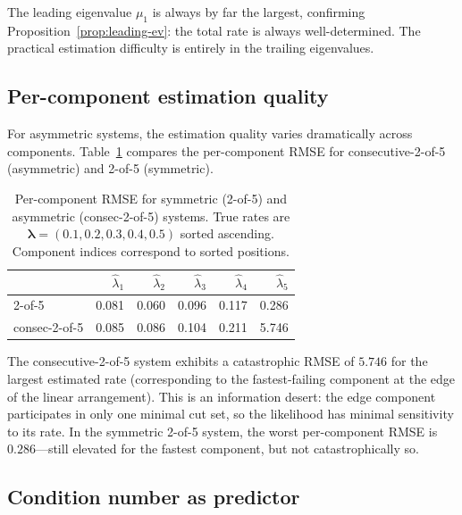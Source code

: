 \documentclass[12pt]{article}
\theoremstyle{definition}
\theoremstyle{remark}
\newcommand{\blam}{\boldsymbol{\lambda}}
\begin{document}
The leading eigenvalue $\mu_1$ is always by far the largest, confirming
Proposition~\ref{prop:leading-ev}: the total rate is always
well-determined.  The practical estimation difficulty is entirely in
the trailing eigenvalues.

\subsection{Per-component estimation quality}
\label{sec:per-component}

For asymmetric systems, the estimation quality varies dramatically
across components.  Table~\ref{tab:per-component} compares the
per-component RMSE for consecutive-2-of-5 (asymmetric) and 2-of-5
(symmetric).

\begin{table}[t]
\centering
\caption{Per-component RMSE for symmetric (2-of-5) and asymmetric
  (consec-2-of-5) systems.  True rates are
  $\blam = (0.1, 0.2, 0.3, 0.4, 0.5)$ sorted ascending.
  Component indices correspond to sorted positions.}
\label{tab:per-component}
\small
\begin{tabular}{lrrrrr}
\toprule
 & $\hat{\lambda}_1$ & $\hat{\lambda}_2$ & $\hat{\lambda}_3$
 & $\hat{\lambda}_4$ & $\hat{\lambda}_5$ \\
\midrule
2-of-5 & 0.081 & 0.060 & 0.096 & 0.117 & 0.286 \\
consec-2-of-5 & 0.085 & 0.086 & 0.104 & 0.211 & 5.746 \\
\bottomrule
\end{tabular}
\end{table}

The consecutive-2-of-5 system exhibits a catastrophic RMSE of $5.746$
for the largest estimated rate (corresponding to the fastest-failing
component at the edge of the linear arrangement).  This is an
information desert: the edge component participates in only one
minimal cut set, so the likelihood has minimal sensitivity to its rate.
In the symmetric 2-of-5 system, the worst per-component RMSE is
$0.286$---still elevated for the fastest component, but not
catastrophically so.

\subsection{Condition number as predictor}
\label{sec:kappa-predictor}
\end{document}
